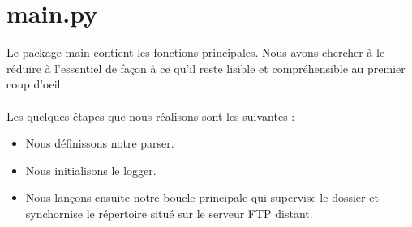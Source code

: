 \section{main.py}

Le package main contient les fonctions principales. 
Nous avons chercher à le réduire à l'essentiel de façon à ce qu'il reste lisible et compréhensible au premier coup d'oeil.\\
\\
Les quelques étapes que nous réalisons sont les suivantes :
\begin{itemize}
\item Nous définissons notre parser.
\item Nous initialisons le logger.
\item Nous lançons ensuite notre boucle principale qui supervise le dossier et synchornise le répertoire situé sur le serveur FTP distant.
\end{itemize}
